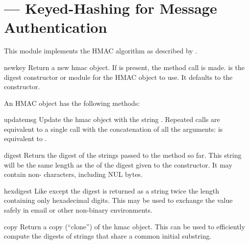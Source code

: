 \section{ ---
         Keyed-Hashing for Message Authentication}



This module implements the HMAC algorithm as described by .

\begin{funcdesc}{new}{key}
  Return a new hmac object.  If  is present, the method call
   is made.  is the digest
  constructor or module for the HMAC object to use. It defaults to 
  the  constructor.  
\end{funcdesc}

An HMAC object has the following methods:

\begin{methoddesc}[hmac]{update}{msg}
  Update the hmac object with the string .  Repeated calls
  are equivalent to a single call with the concatenation of all the
  arguments:  is equivalent to
  .
\end{methoddesc}

\begin{methoddesc}[hmac]{digest}{}
  Return the digest of the strings passed to the 
  method so far.  This string will be the same length as the
   of the digest given to the constructor.  It
  may contain non-\ASCII{} characters, including NUL bytes.
\end{methoddesc}

\begin{methoddesc}[hmac]{hexdigest}{}
  Like  except the digest is returned as a string
  twice the length containing
  only hexadecimal digits.  This may be used to exchange the value
  safely in email or other non-binary environments.
\end{methoddesc}

\begin{methoddesc}[hmac]{copy}{}
  Return a copy (``clone'') of the hmac object.  This can be used to
  efficiently compute the digests of strings that share a common
  initial substring.
\end{methoddesc}

\begin{seealso}
\end{seealso}
